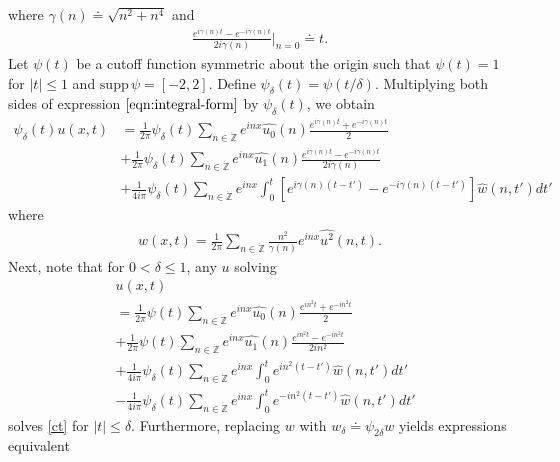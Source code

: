 \documentclass[12pt,reqno]{amsart}
\numberwithin{equation}{section}  %
\renewcommand{\cref}{\Cref}
\newcommand{\zz}{\mathbb{Z}}
\newcommand{\zzdot}{\dot{\zz}}
\newcommand{\wh}{\widehat}
\begin{document}
where $\gamma(n) \doteq \sqrt{n^{2} + n^{4}}$ and
\begin{equation*}
\begin{split}
\frac{e^{i\gamma(n)t} - e^{-i\gamma(n)t}}{2 i \gamma(n)} \vert_{n=0} \doteq t.
\end{split}
\end{equation*}
Let $\psi(t)$ be a cutoff function symmetric about the 
origin such that $\psi(t) = 1$ for $|t| \le 1$ and $\text{supp} \, \psi 
= [-2, 2 ]$.
Define $\psi_{\delta}(t) = \psi(t/\delta)$.
Multiplying both sides of expression
$\cref{eqn:integral-form}$ by $\psi_{\delta}(t)$, we obtain
\begin{equation}
\label{ct}
\begin{split}
\psi_{\delta}(t) u(x,t)
& = \frac{1}{2\pi}\psi_{\delta}(t)\sum_{n \in \zzdot} e^{inx} \wh{u_{0}}(n) \frac{e^{i\gamma(n)t} + e^{-i\gamma(n)t}}{2} 
\\
& + \frac{1}{2 \pi}\psi_{\delta}(t)\sum_{n \in \zzdot} e^{inx}
\wh{u_{1}}(n)\frac{e^{i\gamma(n)t} - e^{-i\gamma(n)t}}{2 i \gamma(n)} 
\\
& + \frac{1}{4 i \pi} \psi_{\delta}(t)\sum_{n \in \zzdot} e^{inx}
\int_{0}^{t}[e^{i\gamma(n)(t-t')}-e^{-i\gamma(n)(t-t')}]
\wh{{w}}(n, t') dt'
\end{split}
\end{equation}
where
\begin{equation*}
\begin{split}
w(x,t) = \frac{1}{2 \pi} \sum_{n \in \zzdot} \frac{n^{2}}{\gamma(n)}e^{inx} \wh{u^{2}}(n, t).
\end{split}
\end{equation*}
Next, note that for $0 < \delta \le 1$, any $u$
solving
\begin{align}
& u(x,t) 
\\
& = \frac{1}{2 \pi}\psi(t)
\sum_{n \in \zzdot} e^{inx} \wh{u_{0}}(n) \frac{e^{in^{2}t} + e^{-in^{2}t}}{2} 
\\
& + \frac{1}{2 \pi}\psi(t) \sum_{n \in \zzdot} e^{inx}
\wh{u_{1}}(n)\frac{e^{in^{2}t} - e^{-in^{2}t}}{2 i n^{2}} 
\\
\label{term-3}
& + \frac{1}{4 i \pi} \psi_{\delta}(t) \sum_{n \in \zzdot} e^{inx}
\int_{0}^{t}e^{in^{2}(t-t')}
\wh{w}(n, t') dt'
\\
\label{term-4}
& - \frac{1}{4 i \pi} \psi_{\delta} (t) \sum_{n \in \zzdot} e^{inx}
\int_{0}^{t}e^{-in^{2}(t-t')}
\wh{w}(n, t') dt'
\end{align}
solves \eqref{ct} for $| t | \le \delta$. 
Furthermore, replacing
$w$ with $w_{\delta} \doteq \psi_{2 \delta} w$ yields expressions equivalent
\end{document}
